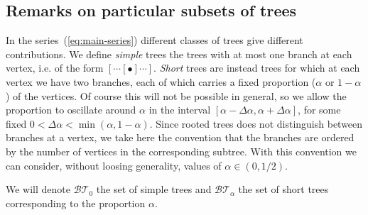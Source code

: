 \documentclass[a4paper,12pt,reqno]{amsart}
\newcommand{\1}{{\bf 1}}
\newcommand{\BT}{\mathcal{BT}}
\begin{document}
\subsection{Remarks on particular subsets of trees}
\label{sec:remarks}
In the series~(\ref{eq:main-series}) different classes of trees give different
contributions. We define \emph{simple} trees the trees with at most
one branch at each vertex, i.e. of the form $[\cdots [\bullet]\cdots
]$. \emph{Short} trees are instead trees for which at  each  vertex we
have two branches, each of which carries a fixed proportion ($\alpha$ or $1-\alpha$) of the
vertices. Of course this will not be possible in general, so we allow
the proportion to oscillate around $\alpha$ in the interval
$[\alpha-\Delta \alpha, \alpha + \Delta \alpha]$, for some fixed $0 <
\Delta \alpha < \min(\alpha,1-\alpha)$. Since rooted trees does not
distinguish between branches at a vertex, we take here the convention
that the branches are ordered by the number of vertices in the
corresponding subtree. With this convention we can consider, without
loosing generality, values of $\alpha \in (0,1/2)$.

We will denote $\BT_0$ the set of simple trees and $\BT_\alpha$ the
set  of short trees corresponding to the proportion $\alpha$. 
\end{document}
